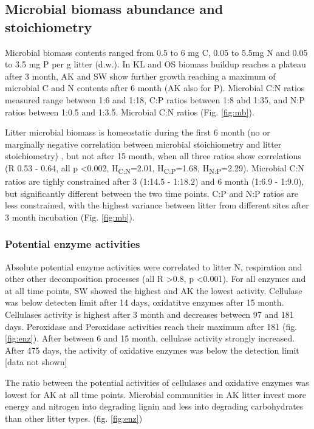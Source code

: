 \documentclass[authoryear,preprint,review,12pt]{elsarticle}
\begin{document}
\subsection{Microbial biomass abundance and stoichiometry}

Microbial biomass contents ranged from 0.5 to 6 mg C, 0.05 to 5.5mg N and 0.05 to 3.5 mg P per g litter (d.w.). In KL and OS biomass buildup reaches a plateau after 3 month, AK and SW show further growth reaching a maximum of microbial C and N contents after 6 month (AK also for P). Microbial C:N ratios measured range between 1:6 and 1:18, C:P ratios between 1:8 abd 1:35, and N:P ratios between 1:0.5 and 1:3.5. Microbial C:N ratios (Fig. \ref{fig:mb}).


Litter microbial biomass is homeostatic during the first 6 month (no or marginally negative correlation between microbial stoichiometry and litter stoichiometry) \citep{Mooshammer2011}, but not after 15 month, when all three ratios show correlations (R 0.53 - 0.64, all p \textless 0.002, H\textsubscript{C:N}=2.01, H\textsubscript{C:P}=1.68, H\textsubscript{N:P}=2.29). Microbial C:N ratios are tighly constrained after 3 (1:14.5 - 1:18.2) and 6 month (1:6.9 - 1:9.0), but significantly different between the two time points. C:P and N:P ratios are less constrained, with the highest variance between litter from different sites after 3 month incubation (Fig. \ref{fig:mb}).

\subsubsection{Potential enzyme activities}
Absolute potential enzyme activities were correlated to litter N, respiration and other other decomposition processes (all R \textgreater  0.8, p \textless 0.001). For all enzymes and at all time points, SW showed the highest and AK the lowest activity. Cellulase was below detecten limit after 14 days, oxidatitve enzymes after 15 month. Cellulases activity is highest after 3 month and decreases between 97 and 181 days. Peroxidase and Peroxidase activities reach their maximum after 181 (fig. \ref{fig:enz}). After between 6 and 15 month, cellulase activity strongly increased. After 475 days, the activity of oxidative enzymes was below the detection limit [data not shown]

The ratio between the potential activities of cellulases and oxidative enzymes was lowest for AK at all time points. Microbial communities in AK litter invest more energy and nitrogen into degrading lignin and less into degrading carbohydrates than other litter types. (fig. \ref{fig:enz})
\end{document}
